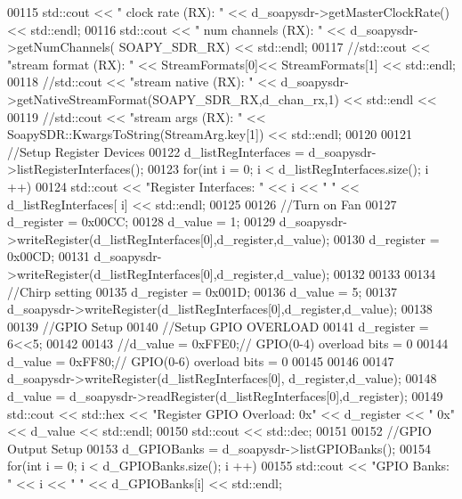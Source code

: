 \begin{DoxyCode}
00115       std::cout << \textcolor{stringliteral}{" clock rate (RX): "} << d_soapysdr->getMasterClockRate() << std::endl;
00116       std::cout << \textcolor{stringliteral}{" num channels (RX): "} << d_soapysdr->getNumChannels(
      SOAPY_SDR_RX) << std::endl;
00117       \textcolor{comment}{//std::cout << "stream format (RX): " << StreamFormats[0]<< StreamFormats[1] << std::endl;}
00118       \textcolor{comment}{//std::cout << "stream native (RX): " << d\_soapysdr->getNativeStreamFormat(SOAPY\_SDR\_RX,d\_chan\_rx,1)
       << std::endl <<}
00119       \textcolor{comment}{//std::cout << "stream args (RX): " << SoapySDR::KwargsToString(StreamArg.key[1]) << std::endl;}
00120 
00121       \textcolor{comment}{//Setup Register Devices}
00122       d_listRegInterfaces = d_soapysdr->listRegisterInterfaces();
00123       \textcolor{keywordflow}{for}(\textcolor{keywordtype}{int} i = 0; i < d_listRegInterfaces.size(); i ++)
00124         std::cout << \textcolor{stringliteral}{"Register Interfaces: "} << i << \textcolor{stringliteral}{" "} << d_listRegInterfaces[
      i] << std::endl;
00125 
00126       \textcolor{comment}{//Turn on Fan}
00127       d_register = 0x00CC;
00128       d_value = 1;
00129       d_soapysdr->writeRegister(d_listRegInterfaces[0],d_register,d_value);
00130       d_register = 0x00CD;
00131       d_soapysdr->writeRegister(d_listRegInterfaces[0],d_register,d_value);
00132 
00133 
00134       \textcolor{comment}{//Chirp setting}
00135       d_register = 0x001D;
00136       d_value = 5;
00137       d_soapysdr->writeRegister(d_listRegInterfaces[0],d_register,d_value);
00138 
00139       \textcolor{comment}{//GPIO Setup}
00140       \textcolor{comment}{//Setup GPIO OVERLOAD}
00141       d_register = 6<<5;
00142 
00143       \textcolor{comment}{//d\_value = 0xFFE0;// GPIO(0-4) overload bits = 0}
00144       d_value = 0xFF80;\textcolor{comment}{// GPIO(0-6) overload bits = 0}
00145 
00146 
00147       d_soapysdr->writeRegister(d_listRegInterfaces[0], d_register,d_value);
00148       d_value = d_soapysdr->readRegister(d_listRegInterfaces[0],d_register);
00149       std::cout << std::hex << \textcolor{stringliteral}{"Register GPIO Overload: 0x"}  << d_register << \textcolor{stringliteral}{" 0x"}  <<  
      d_value << std::endl;
00150       std::cout << std::dec;
00151 
00152       \textcolor{comment}{//GPIO Output Setup}
00153       d_GPIOBanks = d_soapysdr->listGPIOBanks();
00154       \textcolor{keywordflow}{for}(\textcolor{keywordtype}{int} i = 0; i < d_GPIOBanks.size(); i ++)
00155         std::cout << \textcolor{stringliteral}{"GPIO Banks: "} << i << \textcolor{stringliteral}{" "} << d_GPIOBanks[i] << std::endl;

\end{DoxyCode}
